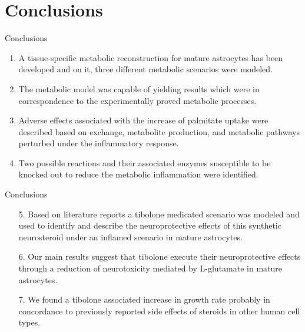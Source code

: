 \documentclass[11pt]{beamer}
\begin{document}
\section{Conclusions}
\begin{frame}{Conclusions}
\begin{center}
\begin{enumerate}
\item  A tissue-specific metabolic reconstruction for mature astrocytes has been developed and on it, three different metabolic scenarios were modeled.
\item The metabolic model was capable of yielding results which were in correspondence to the experimentally proved metabolic processes.
\item Adverse effects associated with the increase of palmitate uptake were described based on exchange, metabolite production, and metabolic pathways perturbed under the inflammatory response.
\item Two possible reactions and their associated enzymes susceptible to be knocked out to reduce the metabolic inflammation were identified.
\end{enumerate}
\end{center}
\end{frame}
\begin{frame}{Conclusions}
\begin{center}
\begin{enumerate}
\item[5.]  Based on literature reports a tibolone medicated scenario was modeled and used to identify and describe the neuroprotective effects of this synthetic neurosteroid under an inflamed scenario in mature astrocytes.
\item[6.] Our main results suggest that tibolone execute their neuroprotective effects through a reduction of neurotoxicity mediated by L-glutamate in mature astrocytes.
\item[7.] We found a tibolone associated increase in growth rate probably in concordance to previously reported side effects of steroids in other human cell types.
\end{enumerate}
\end{center}
\end{frame}
\end{document}
